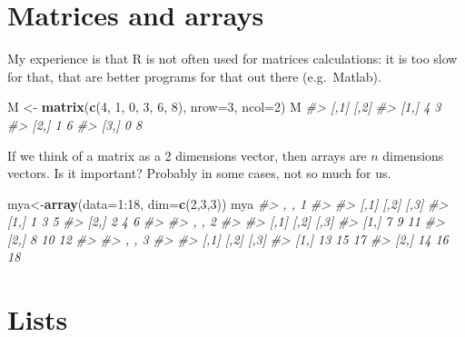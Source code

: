 \documentclass[]{book}
\newenvironment{Shaded}{}{}
\newcommand{\CommentTok}[1]{\textcolor[rgb]{0.38,0.63,0.69}{\textit{#1}}}
\newcommand{\DataTypeTok}[1]{\textcolor[rgb]{0.56,0.13,0.00}{#1}}
\newcommand{\DecValTok}[1]{\textcolor[rgb]{0.25,0.63,0.44}{#1}}
\newcommand{\KeywordTok}[1]{\textcolor[rgb]{0.00,0.44,0.13}{\textbf{#1}}}
\newcommand{\NormalTok}[1]{#1}
\newcommand{\OperatorTok}[1]{\textcolor[rgb]{0.40,0.40,0.40}{#1}}
\newcommand{\StringTok}[1]{\textcolor[rgb]{0.25,0.44,0.63}{#1}}
\theoremstyle{definition}
\theoremstyle{definition}
\theoremstyle{definition}
\theoremstyle{remark}
\begin{document}
\hypertarget{matrices-and-arrays}{%
\section{Matrices and arrays}\label{matrices-and-arrays}}

My experience is that R is not often used for matrices calculations: it
is too slow for that, that are better programs for that out there
(e.g.~Matlab).

\begin{Shaded}
\begin{Highlighting}[]
\NormalTok{M <-}\StringTok{ }\KeywordTok{matrix}\NormalTok{(}\KeywordTok{c}\NormalTok{(}\DecValTok{4}\NormalTok{, }\DecValTok{1}\NormalTok{, }\DecValTok{0}\NormalTok{, }\DecValTok{3}\NormalTok{, }\DecValTok{6}\NormalTok{, }\DecValTok{8}\NormalTok{), }\DataTypeTok{nrow=}\DecValTok{3}\NormalTok{, }\DataTypeTok{ncol=}\DecValTok{2}\NormalTok{) }
\NormalTok{M}
\CommentTok{#>      [,1] [,2]}
\CommentTok{#> [1,]    4    3}
\CommentTok{#> [2,]    1    6}
\CommentTok{#> [3,]    0    8}
\end{Highlighting}
\end{Shaded}

If we think of a matrix as a 2 dimensions vector, then arrays are \(n\)
dimensions vectors. Is it important? Probably in some cases, not so much
for us.

\begin{Shaded}
\begin{Highlighting}[]
\NormalTok{mya<-}\KeywordTok{array}\NormalTok{(}\DataTypeTok{data=}\DecValTok{1}\OperatorTok{:}\DecValTok{18}\NormalTok{, }\DataTypeTok{dim=}\KeywordTok{c}\NormalTok{(}\DecValTok{2}\NormalTok{,}\DecValTok{3}\NormalTok{,}\DecValTok{3}\NormalTok{))}
\NormalTok{mya}
\CommentTok{#> , , 1}
\CommentTok{#> }
\CommentTok{#>      [,1] [,2] [,3]}
\CommentTok{#> [1,]    1    3    5}
\CommentTok{#> [2,]    2    4    6}
\CommentTok{#> }
\CommentTok{#> , , 2}
\CommentTok{#> }
\CommentTok{#>      [,1] [,2] [,3]}
\CommentTok{#> [1,]    7    9   11}
\CommentTok{#> [2,]    8   10   12}
\CommentTok{#> }
\CommentTok{#> , , 3}
\CommentTok{#> }
\CommentTok{#>      [,1] [,2] [,3]}
\CommentTok{#> [1,]   13   15   17}
\CommentTok{#> [2,]   14   16   18}
\end{Highlighting}
\end{Shaded}

\hypertarget{lists}{%
\section{Lists}\label{lists}}
\end{document}
